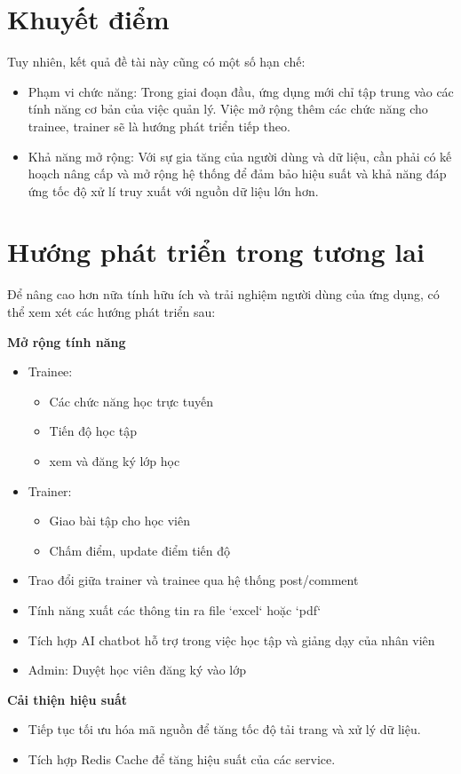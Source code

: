 \documentclass[report.tex]{subfiles}
\begin{document}
\section*{Khuyết điểm}

Tuy nhiên, kết quả đề tài này cũng có một số hạn chế:

\begin{itemize}[noitemsep]
\item Phạm vi chức năng: Trong giai đoạn đầu, ứng dụng mới chỉ tập trung vào các tính năng cơ bản của việc quản lý.
Việc mở rộng thêm các chức năng cho trainee, trainer sẽ là hướng phát triển tiếp theo.
\item Khả năng mở rộng: Với sự gia tăng của người dùng và dữ liệu, cần phải có kế hoạch nâng cấp
và mở rộng hệ thống để đảm bảo hiệu suất và khả năng đáp ứng tốc độ xử lí truy xuất với nguồn dữ liệu lớn hơn.
\end{itemize}

\section*{Hướng phát triển trong tương lai}

Để nâng cao hơn nữa tính hữu ích và trải nghiệm người dùng của ứng dụng,
có thể xem xét các hướng phát triển sau:

\textbf{Mở rộng tính năng}
\begin{itemize}[noitemsep]
\item Trainee:
\begin{itemize}[noitemsep]
  \item Các chức năng học trực tuyến
  \item Tiến độ học tập
  \item xem và đăng ký lớp học
\end{itemize}
\item Trainer:
\begin{itemize}[noitemsep]
  \item Giao bài tập cho học viên
  \item Chấm điểm, update điểm tiến độ
\end{itemize}
\item Trao đổi giữa trainer và trainee qua hệ thống post/comment
\item Tính năng xuất các thông tin ra file `excel` hoặc `pdf`
\item Tích hợp AI chatbot hỗ trợ trong việc học tập và giảng dạy của nhân viên
\item Admin: Duyệt học viên đăng ký vào lớp
\end{itemize}

\textbf{Cải thiện hiệu suất}

\begin{itemize}[noitemsep]
\item Tiếp tục tối ưu hóa mã nguồn để tăng tốc độ tải trang và xử lý dữ liệu.
\item Tích hợp Redis Cache để tăng hiệu suất của các service.
\end{itemize}
\end{document}
